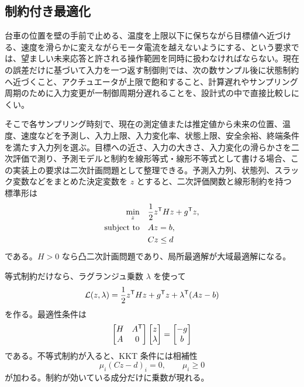 \subsection{制約付き最適化}

台車の位置を壁の手前で止める、温度を上限以下に保ちながら目標値へ近づける、速度を滑らかに変えながらモータ電流を越えないようにする、という要求では、望ましい未来応答と許される操作範囲を同時に扱わなければならない。現在の誤差だけに基づいて入力を一つ返す制御則では、次の数サンプル後に状態制約へ近づくこと、アクチュエータが上限で飽和すること、計算遅れやサンプリング周期のために入力変更が一制御周期分遅れることを、設計式の中で直接比較しにくい。

そこで各サンプリング時刻で、現在の測定値または推定値から未来の位置、温度、速度などを予測し、入力上限、入力変化率、状態上限、安全余裕、終端条件を満たす入力列を選ぶ。目標への近さ、入力の大きさ、入力変化の滑らかさを二次評価で測り、予測モデルと制約を線形等式・線形不等式として書ける場合、この実装上の要求は二次計画問題として整理できる。予測入力列、状態列、スラック変数などをまとめた決定変数を $z$ とすると、二次評価関数と線形制約を持つ標準形は
\begin{align}
  \min_z\quad &\frac{1}{2}z^{\mathsf{T}} H z+g^{\mathsf{T}} z,\\
  \text{subject to}\quad &Az=b,\\
  &Cz\le d
\end{align}
である。$H>0$ なら凸二次計画問題であり、局所最適解が大域最適解になる。

等式制約だけなら、ラグランジュ乗数 $\lambda$ を使って
\begin{equation}
  \mathcal{L}(z,\lambda)=\frac{1}{2}z^{\mathsf{T}} Hz+g^{\mathsf{T}} z+\lambda^{\mathsf{T}}(Az-b)
\end{equation}
を作る。最適性条件は
\begin{equation}
  \begin{bmatrix}H&A^{\mathsf{T}}\\ A&0\end{bmatrix}
  \begin{bmatrix}z\\ \lambda\end{bmatrix}
  =
  \begin{bmatrix}-g\\ b\end{bmatrix}
\end{equation}
である。不等式制約が入ると、KKT 条件には相補性
\begin{equation}
  \mu_i(Cz-d)_i=0,
  \qquad
  \mu_i\ge0
\end{equation}
が加わる。制約が効いている成分だけに乗数が現れる。

